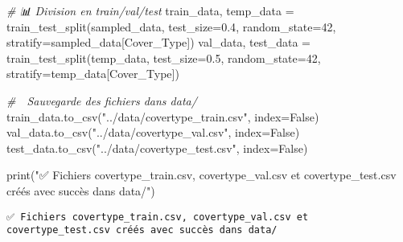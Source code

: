 \documentclass[
]{article}
\newenvironment{Shaded}{}{}
\newcommand{\BuiltInTok}[1]{\textcolor[rgb]{0.00,0.50,0.00}{#1}}
\newcommand{\CommentTok}[1]{\textcolor[rgb]{0.38,0.63,0.69}{\textit{#1}}}
\newcommand{\DecValTok}[1]{\textcolor[rgb]{0.25,0.63,0.44}{#1}}
\newcommand{\FloatTok}[1]{\textcolor[rgb]{0.25,0.63,0.44}{#1}}
\newcommand{\NormalTok}[1]{#1}
\newcommand{\OperatorTok}[1]{\textcolor[rgb]{0.40,0.40,0.40}{#1}}
\newcommand{\StringTok}[1]{\textcolor[rgb]{0.25,0.44,0.63}{#1}}
\newcommand{\VariableTok}[1]{\textcolor[rgb]{0.10,0.09,0.49}{#1}}
\begin{document}
\begin{Shaded}
\begin{Highlighting}[]
\CommentTok{\# 📊 Division en train/val/test}
\NormalTok{train\_data, temp\_data }\OperatorTok{=}\NormalTok{ train\_test\_split(sampled\_data, test\_size}\OperatorTok{=}\FloatTok{0.4}\NormalTok{, random\_state}\OperatorTok{=}\DecValTok{42}\NormalTok{, stratify}\OperatorTok{=}\NormalTok{sampled\_data[}\StringTok{\textquotesingle{}Cover\_Type\textquotesingle{}}\NormalTok{])}
\NormalTok{val\_data, test\_data }\OperatorTok{=}\NormalTok{ train\_test\_split(temp\_data, test\_size}\OperatorTok{=}\FloatTok{0.5}\NormalTok{, random\_state}\OperatorTok{=}\DecValTok{42}\NormalTok{, stratify}\OperatorTok{=}\NormalTok{temp\_data[}\StringTok{\textquotesingle{}Cover\_Type\textquotesingle{}}\NormalTok{])}

\CommentTok{\# 📂 Sauvegarde des fichiers dans data/}
\NormalTok{train\_data.to\_csv(}\StringTok{"../data/covertype\_train.csv"}\NormalTok{, index}\OperatorTok{=}\VariableTok{False}\NormalTok{)}
\NormalTok{val\_data.to\_csv(}\StringTok{"../data/covertype\_val.csv"}\NormalTok{, index}\OperatorTok{=}\VariableTok{False}\NormalTok{)}
\NormalTok{test\_data.to\_csv(}\StringTok{"../data/covertype\_test.csv"}\NormalTok{, index}\OperatorTok{=}\VariableTok{False}\NormalTok{)}

\BuiltInTok{print}\NormalTok{(}\StringTok{"✅ Fichiers covertype\_train.csv, covertype\_val.csv et covertype\_test.csv créés avec succès dans data/"}\NormalTok{)}
\end{Highlighting}
\end{Shaded}

\begin{verbatim}
✅ Fichiers covertype_train.csv, covertype_val.csv et covertype_test.csv créés avec succès dans data/
\end{verbatim}
\end{document}
